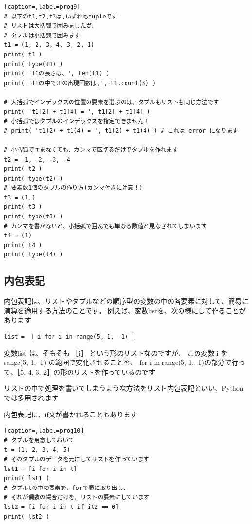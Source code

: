\documentclass[uplatex,a4paper,11pt,oneside,openany]{jsbook}
\begin{document}
\begin{lstlisting}[caption=,label=prog9]
# 以下のt1,t2,t3は,いずれもtupleです
# リストは大括弧で囲みましたが、
# タプルは小括弧で囲みます
t1 = (1, 2, 3, 4, 3, 2, 1)
print( t1 )
print( type(t1) )
print( 't1の長さは、', len(t1) )
print( 't1の中で３の出現回数は,', t1.count(3) )

# 大括弧でインデックスの位置の要素を選ぶのは、タプルもリストも同じ方法です
print( 't1[2] + t1[4] = ', t1[2] + t1[4] )
# 小括弧ではタプルのインデックスを指定できません！
# print( 't1(2) + t1(4) = ', t1(2) + t1(4) ) # これは error になります

# 小括弧で囲まなくても、カンマで区切るだけでタプルを作れます
t2 = -1, -2, -3, -4
print( t2 )
print( type(t2) )
# 要素数1個のタプルの作り方(カンマ付きに注意！）
t3 = (1,)
print( t3 )
print( type(t3) )
# カンマを書かないと、小括弧で囲んでも単なる数値と見なされてしまいます
t4 = (1)
print( t4 )
print( type(t4) )
\end{lstlisting}%

\subsection{内包表記}

内包表記は、リストやタプルなどの順序型の変数の中の各要素に対して、簡易に演算を適用する方法のことです。
例えば、変数listを、次の様にして作ることがあります

\begin{verbatim}list = ［ i for i in range(5, 1, -1) ］\end{verbatim}

変数list は、そもそも ［i］ という形のリストなのですが、
この変数 i を range(5, 1, -1) の範囲で変化させることを、
for i in range(5, 1, -1)の部分で行って、［5, 4, 3, 2］の形のリストを作っているのです

リストの中で処理を書いてしまうような方法をリスト内包表記といい、Pythonでは多用されます



内包表記に、if文が書かれることもあります

\begin{lstlisting}[caption=,label=prog10]
# タプルを用意しておいて
t = (1, 2, 3, 4, 5)
# そのタプルのデータを元にしてリストを作っています
lst1 = [i for i in t]
print( lst1 )
# タプルtの中の要素を、forで順に取り出し、
# それが偶数の場合だけを、リストの要素にしています
lst2 = [i for i in t if i%2 == 0]
print( lst2 )
\end{lstlisting}%
\end{document}
